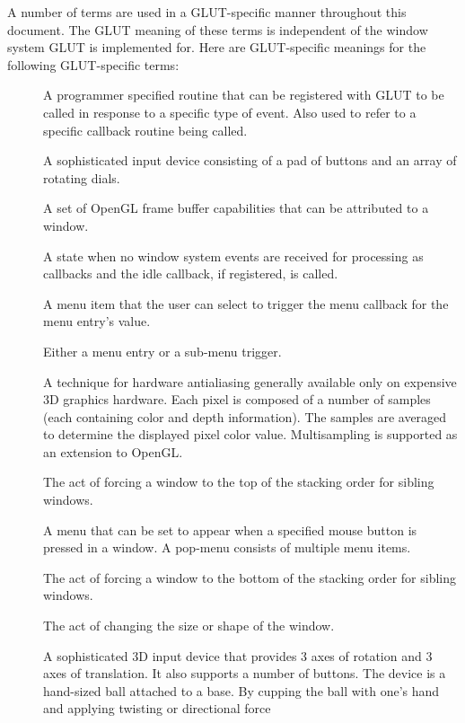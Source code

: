 A number of terms are used in a GLUT-specific manner throughout this
document.  The GLUT meaning of these terms is independent of the
window system GLUT is implemented for.  Here are GLUT-specific
meanings for the following GLUT-specific terms:
\begin{description}
\item[\em {}]  A programmer specified routine that can be
registered with GLUT to be called in response to a specific type
of event.  Also used to refer to a specific callback routine
being called.
\item[\em {}]  A sophisticated input device
consisting of a pad of buttons and an array of rotating dials.
\item[\em {}]  A set of OpenGL frame buffer capabilities
that can be attributed to a window.
\item[\em {}]  A state when no window system events are received
for processing as callbacks and the idle callback, if registered,
is called.
\item[\em {}]  A menu item that the user can select to
trigger the menu callback for the menu entry's value.
\item[\em {}]  Either a menu entry or a sub-menu trigger.
\item[\em {}]  A technique for hardware antialiasing
generally available only on expensive 3D graphics hardware.  Each
pixel is composed of a number of samples (each containing color and
depth information).  The samples are averaged to determine the
displayed pixel color value.  Multisampling is supported as an
extension to OpenGL.
\item[\em {}]  The act of forcing a window to the top of the
stacking order for sibling windows.
\item[\em {}]  A menu that can be set to appear when a specified
mouse button is pressed in a window.  A pop-menu consists of multiple
menu items.
\item[\em {}]  The act of forcing a window to the bottom of the
stacking order for sibling windows.
\item[\em {}]  The act of changing the size or shape of the window.
\item[\em {}]  A sophisticated 3D input device that provides 3
axes of rotation and 3 axes of translation.  It also supports a number
of buttons.  The device is a hand-sized ball attached to a base.  By
cupping the ball with one's hand and applying twisting or directional force

\end{description}
